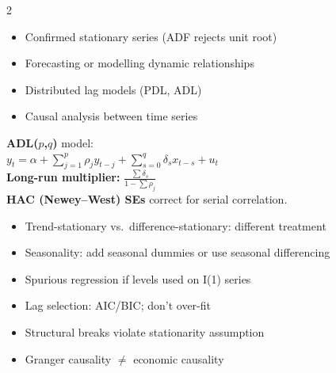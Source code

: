 \documentclass[10pt,a4paper]{article}
\begin{document}
\begin{multicols}{2}

\begin{tcolorbox}[when]
\begin{itemize}
  \item Confirmed stationary series (ADF rejects unit root)
  \item Forecasting or modelling dynamic relationships
  \item Distributed lag models (PDL, ADL)
  \item Causal analysis between time series
\end{itemize}
\end{tcolorbox}

\begin{tcolorbox}[key]
\textbf{ADL($p$,$q$)} model:\\
$y_t = \alpha + \sum_{j=1}^p \rho_j y_{t-j} + \sum_{s=0}^q \delta_s x_{t-s} + u_t$\\[4pt]
\textbf{Long-run multiplier:} $\frac{\sum \delta_s}{1 - \sum \rho_j}$\\[4pt]
\textbf{HAC (Newey--West) SEs} correct for serial correlation.
\end{tcolorbox}

\columnbreak

\begin{tcolorbox}[watchout]
\begin{itemize}
  \item Trend-stationary vs.\ difference-stationary: different treatment
  \item Seasonality: add seasonal dummies or use seasonal differencing
  \item Spurious regression if levels used on I(1) series
  \item Lag selection: AIC/BIC; don't over-fit
  \item Structural breaks violate stationarity assumption
  \item Granger causality $\neq$ economic causality
\end{itemize}
\end{tcolorbox}

\end{multicols}
\end{document}
